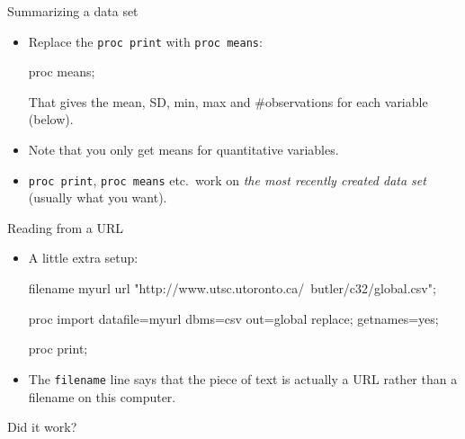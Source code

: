 \documentclass[unknownkeysallowed]{beamer}\usepackage[]{graphicx}\usepackage[]{color}
\begin{document}
\begin{frame}[fragile]{Summarizing a data set}
  
  \begin{itemize}
  \item Replace the \texttt{proc print} with \texttt{proc means}:
    
    \begin{Sascode}[store=rb]
proc means;      
    \end{Sascode}
    
    That gives the mean, SD, min, max and \#observations for each
    variable (below).
    
    \item Note that you only get means for quantitative variables.
    \item \texttt{proc print}, \texttt{proc means} etc.\ work on
      \emph{the most recently created data set} (usually what you
      want). 
    


  \end{itemize}
  
\end{frame}

\begin{frame}[fragile]{Reading from a URL}
  
  \begin{itemize}
  \item A little extra setup:
    
    \begin{Sascode}[store=ua]
filename myurl 
  url "http://www.utsc.utoronto.ca/~butler/c32/global.csv";

proc import 
  datafile=myurl 
  dbms=csv
  out=global
  replace;
  getnames=yes;
  
proc print;
    \end{Sascode}
    
    
  \item The \texttt{filename} line says that the piece of text is
    actually a URL rather than a filename on this computer.
  \end{itemize}
  
\end{frame}

\begin{frame}[fragile]{Did it work?}
  
  
\end{frame}
\end{document}
